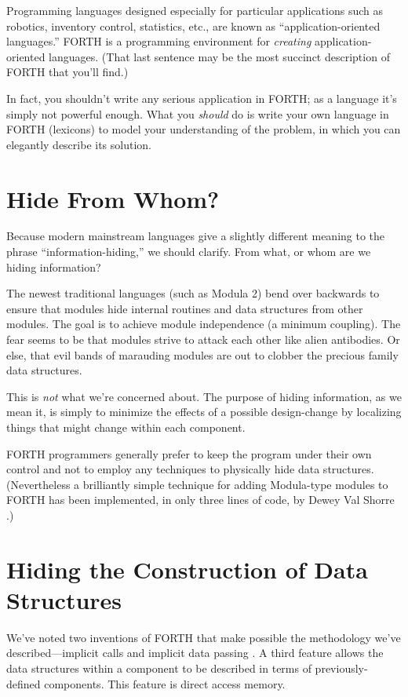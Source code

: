 Programming languages designed especially for particular applications
such as robotics, inventory control, statistics, etc., are known as
``application-oriented languages.'' FORTH is a programming environment
for \emph{creating} app\-li\-ca\-tion-oriented languages. (That last
sentence may be the most succinct description of FORTH that you'll
find.)

In fact, you shouldn't write any serious application in FORTH; as a
language it's simply not powerful enough. What you \emph{should} do is
write your own language in FORTH (lexicons) to model your
understanding of the problem, in which you can elegantly describe its
solution.


\section{Hide From Whom?}
Because modern mainstream languages give a slightly different meaning
to the phrase ``information-hiding,'' we should clarify. From what, or
whom are we hiding information?

The newest traditional languages (such as Modula 2) bend over
backwards to ensure that modules hide internal routines and data
structures from other modules. The goal is to achieve module
independence (a minimum coupling). The fear seems to be that modules
strive to attack each other like alien antibodies. Or else, that evil
bands of marauding modules are out to clobber the precious family data
structures.

This is \emph{not} what we're concerned about. The purpose of hiding
information, as we mean it, is simply to minimize the effects of a
possible design-change by localizing things that might change within
each component.

FORTH programmers generally prefer to keep the program under their own
control and not to employ any techniques to physically hide data
structures. (Nevertheless a brilliantly simple technique for adding
Modula-type modules to FORTH has been implemented, in only three lines
of code, by Dewey Val Shorre \cite{shorre71}.)


\section{Hiding the Construction of Data Structures}
We've noted two inventions of FORTH that make possible the methodology
we've described---implicit calls and implicit data passing
. A third
feature allows the data structures within a component to be described
in terms of previously-defined components. This feature is direct
access memory.

